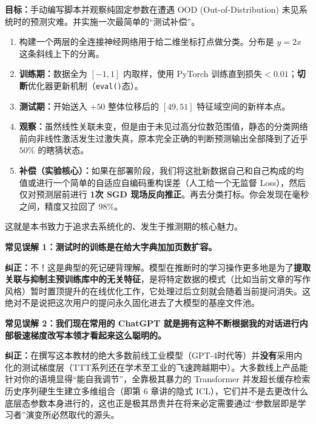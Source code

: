 \begin{labbox}[title=Lab 1: 验证静态参数大模型在简单位移下有多“脆弱”]
\textbf{目标：}手动编写脚本并观察纯固定参数在遭遇 OOD (Out-of-Distribution) 未见系统时的预测灾难。并实施一次最简单的“测试补偿”。

\begin{enumerate}
    \item 构建一个两层的全连接神经网络用于给二维坐标打点做分类。分布是 $y = 2x$ 这条斜线上下的分离。
    \item \textbf{训练期：}数据全为 $[-1, 1]$ 内取样，使用 PyTorch 训练直到损失$<0.01$；\textbf{切断}优化器更新机制（\texttt{eval()}态）。
    \item \textbf{测试期：}开始送入 $+50$ 整体位移后的 $[49, 51]$ 特征域空间的新样本点。
    \item \textbf{观察：}虽然线性关联未变，但是由于未见过高分位数范围值，静态的分类网络前向非线性激活发生过激失真，原本完全正确的判断预测输出全部降到了近乎 $50\%$ 的瞎猜状态。
    \item \textbf{补偿（实验核心）：}如果在部署阶段，我们将这批新数据自己和自己构成的均值或进行一个简单的自适应自编码重构误差（人工给一个无监督 Loss），然后仅对预测层前进行 \textbf{1次 SGD 现场反向推正}。再去分类打标。你会发现在毫秒之间，精度又拉回了 $98\%$。
\end{enumerate}
这就是本书致力于追求去系统化的、发生于推测期的核心魅力。
\end{labbox}

\begin{misconceptionbox}
\textbf{常见误解 1：测试时的训练是在给大字典加加页数扩容。}

\textbf{纠正：}不！这是典型的死记硬背理解。模型在推断时的学习操作更多地是为了\textbf{提取关联与抑制主预训练库中的无关特征}，是将特定数据的模式（比如当前文章的写作风格）暂时置顶提升的在线优化工作，它处理过后立刻就会随着当前提问消失。这绝对不是说把这次用户的提问永久固化进去了大模型的基座文件池。
\end{misconceptionbox}

\begin{misconceptionbox}
\textbf{常见误解 2：我们现在常用的 ChatGPT 就是拥有这种不断根据我的对话进行内部极速梯度改写本领才看起来这么聪明的。}

\textbf{纠正：}在撰写这本教材的绝大多数前线工业模型（GPT-4时代等）并\textbf{没有}采用内化的测试梯度层（TTT系列还在学术至工业的飞速跨越期中）。大多数线上产品能针对你的语境显得“能自我调节”，全靠极其暴力的 Transformer 并发超长缓存检索历史序列硬生生建立多维组合（即第 6 章讲的隐式 ICL），它们并不是去更改什么底层态参数本身进行的，这也正是极其昂贵并在将来必定需要通过“参数层即是学习者”演变所必然取代的源头。
\end{misconceptionbox}

